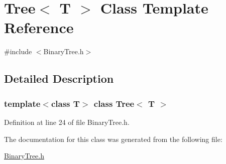 \hypertarget{class_tree}{}\section{Tree$<$ T $>$ Class Template Reference}
\label{class_tree}


{\ttfamily \#include $<$Binary\+Tree.\+h$>$}



\subsection{Detailed Description}
\subsubsection*{template$<$class T$>$\newline
class Tree$<$ T $>$}



Definition at line 24 of file Binary\+Tree.\+h.



The documentation for this class was generated from the following file\+:\begin{DoxyCompactItemize}
\item 
\mbox{\hyperlink{_binary_tree_8h}{Binary\+Tree.\+h}}\end{DoxyCompactItemize}
